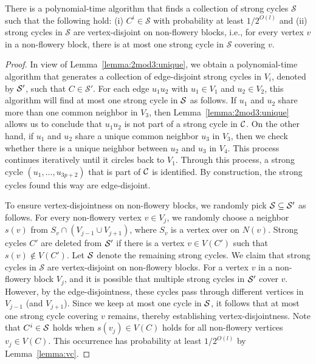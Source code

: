 \begin{lemma} \label{lemma:2mod3:find-cycles}
  There is a polynomial-time algorithm that finds a collection of strong cycles
  $\mathcal{S}$ such that the following hold: (i) $C^i \in \mathcal{S}$ with probability at least $1/2^{O(l)}$ and (ii) strong cycles in $\mathcal{S}$ are vertex-disjoint on non-flowery blocks, i.e., for every vertex $v$ in a non-flowery block, there is at most one strong cycle in $\mathcal{S}$ covering $v$.
\end{lemma}
\begin{proof}
  In view of Lemma~\ref{lemma:2mod3:unique}, we obtain a polynomial-time algorithm that generates a collection of edge-disjoint strong cycles in $V_i$, denoted by $\mathcal S'$, such that $C \in \mathcal{S}'$.
  For each edge $u_1 u_2$ with $u_1 \in V_{1}$ and $u_2 \in V_{2}$, this algorithm will find at most one strong cycle in $\mathcal S$ as follows.
  If $u_1$ and $u_2$ share more than one common neighbor in $V_{3}$, then Lemma~\ref{lemma:2mod3:unique} allows us to conclude that $u_1 u_2$ is not part of a strong cycle in $\mathcal C$.
  On the other hand, if $u_1$ and $u_2$ share a unique common neighbor $u_3$ in $V_{3}$, then we check whether there is a unique neighbor between $u_2$ and $u_3$ in $V_{4}$.
  This process continues iteratively until it circles back to $V_{1}$.
  Through this process, a strong cycle $(u_1, \dots, u_{3p+2})$ that is part of $\mathcal C$ is identified.
  By construction, the strong cycles found this way are edge-disjoint.

  To ensure vertex-disjointness on non-flowery blocks, we randomly pick $\mathcal S \subseteq \mathcal S'$ as follows.
  For every non-flowery vertex $v \in V_j$, we randomly choose a neighbor $s(v)$ from $S_v \cap (V_{j-1} \cup V_{j+1})$, where $S_v$ is a vertex over on $N(v)$.
  Strong cycles $C'$ are deleted from $\mathcal S'$ if there is a vertex $v \in V(C')$ such that $s(v) \notin V(C')$.
  Let $\mathcal S$ denote the remaining strong cycles.
  We claim that strong cycles in $\mathcal{S}$ are vertex-disjoint on non-flowery blocks.
  For a vertex $v$ in a non-flowery block $V_j$, and it is possible that multiple strong cycles in $\mathcal S'$ cover $v$.
  However, by the edge-disjointness, these cycles pass through different vertices in $V_{j-1}$ (and $V_{j+1}$).
  Since we keep at most one cycle in $\mathcal S$, it follows that at most one strong cycle covering $v$ remains, thereby establishing vertex-disjointness.
  Note that $C^i \in \mathcal S$ holds when $s(v_j) \in V(C)$ holds for all non-flowery vertices $v_j \in V(C)$.
  This occurrence has probability at least $1/2^{O(l)}$ by Lemma~\ref{lemma:vc}.
\end{proof}


